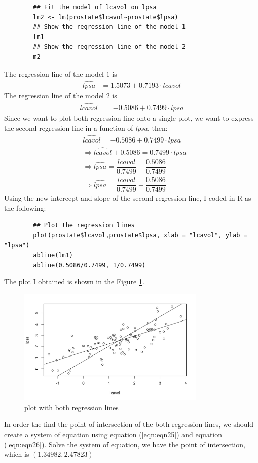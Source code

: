 \begin{answer}
\begin{verbatim}
        ## Fit the model of lcavol on lpsa
        lm2 <- lm(prostate$lcavol~prostate$lpsa)
        ## Show the regression line of the model 1
        lm1
        ## Show the regression line of the model 2
        m2
    \end{verbatim}
    The regression line of the model $1$ is 
        \begin{align}
            \widehat{lpsa} & = 1.5073 + 0.7193\cdot lcavol \label{eqn:eqn25}
        \end{align}
    The regression line of the model $2$ is 
        \begin{align}
            \widehat{lcavol} & = -0.5086 + 0.7499\cdot lpsa \label{eqn:eqn26}
        \end{align}
    Since we want to plot both regression line onto a single plot, we want to express the second regression line in a function of \textit{lpsa}, then:    
        \begin{align}
            &\widehat{lcavol} = -0.5086 + 0.7499\cdot lpsa\\
            &\Rightarrow \widehat{lcavol} + 0.5086 = 0.7499\cdot lpsa\\
            &\Rightarrow \widehat{lpsa} = \dfrac{lcavol}{0.7499} + \dfrac{0.5086}{0.7499}\\
            &\Rightarrow \widehat{lpsa} = \dfrac{lcavol}{0.7499} + \dfrac{0.5086}{0.7499}
        \end{align}
    Using the new intercept and slope of the second regression line, I coded in R as the following:
    \begin{verbatim}
        ## Plot the regression lines
        plot(prostate$lcavol,prostate$lpsa, xlab = "lcavol", ylab = "lpsa")
        abline(lm1) 
        abline(0.5086/0.7499, 1/0.7499)
    \end{verbatim}
    The plot I obtained is shown in the Figure \ref{fig:fig2}.
    \begin{figure}[H]
        \centering
        \includegraphics[width=0.8\textwidth]{Figure 2.png}
        \caption{\label{fig:fig2}plot with both regression lines}
    \end{figure}
    In order the find the point of intersection of the both regression lines, we should create a system of equation using equation (\ref{eqn:eqn25}) and equation (\ref{eqn:eqn26}). Solve the system of equation, we have the point of intersection, which is $(1.34982,2.47823)$
\end{answer}